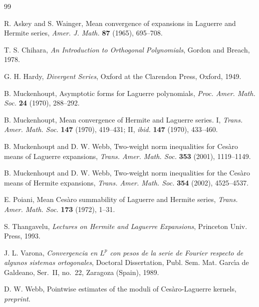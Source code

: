 \documentclass{amsart}
\theoremstyle{plain}
\theoremstyle{definition}
\theoremstyle{remark}
\begin{document}
\begin{thebibliography}{99}

 R. Askey and S. Wainger,
{Mean convergence of expansions in Laguerre and Hermite series},
\textit{Amer. J. Math.}
\textbf{87} (1965), 695--708.

 T. S. Chihara,
\textit{An Introduction to Orthogonal Polynomials},
Gordon and Breach, 1978.

 G. H. Hardy,
\textit{Divergent Series},
Oxford at the Clarendon Press, Oxford, 1949.

 B. Muckenhoupt,
{Asymptotic forms for Laguerre polynomials},
\textit{Proc. Amer. Math. Soc.}
\textbf{24} (1970), 288--292.

 B. Muckenhoupt,
{Mean convergence of Hermite and Laguerre series. I},
\textit{Trans. Amer. Math. Soc.}
\textbf{147} (1970), 419--431;
{II}, \textit{ibid.} \textbf{147} (1970), 433--460.

 B. Muckenhoupt and D. W. Webb,
{Two-weight norm inequalities for Ces\`aro means
of Laguerre expansions},
\textit{Trans. Amer. Math. Soc.}
\textbf{353} (2001), 1119--1149.

 B. Muckenhoupt and D. W. Webb,
{Two-weight norm inequalities for the Ces\`aro means
of Hermite expansions},
\textit{Trans. Amer. Math. Soc.}
\textbf{354} (2002), 4525--4537.

 E. Poiani,
{Mean Ces\`aro summability of Laguerre and Hermite series},
\textit{Trans. Amer. Math. Soc.}
\textbf{173} (1972), 1--31.

 S. Thangavelu,
\textit{Lectures on Hermite and Laguerre Expansions},
Princeton Univ. Press, 1993.

 J. L. Varona,
\textit{Convergencia en $L^p$ con pesos de la serie de Fourier
respecto de algunos sistemas ortogonales},
Doctoral Dissertation,
Publ. Sem. Mat. Garc\'{\i}a de Galdeano,
Ser.~II, no.~22, Zaragoza (Spain), 1989.

 D. W. Webb,
{Pointwise estimates of the moduli of Ces\`aro-Laguerre kernels},
\textit{preprint}.

\end{thebibliography}
\end{document}
